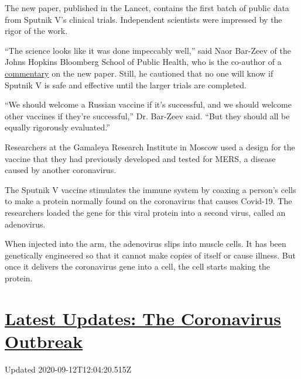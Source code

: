 The new paper, published in the Lancet, contains the first batch of
public data from Sputnik V's clinical trials. Independent scientists
were impressed by the rigor of the work.

``The science looks like it was done impeccably well,'' said Naor
Bar-Zeev of the Johns Hopkins Bloomberg School of Public Health, who is
the co-author of a
\href{https://www.thelancet.com/journals/lancet/article/PIIS0140-6736(20)31867-5/fulltext}{commentary}
on the new paper. Still, he cautioned that no one will know if Sputnik V
is safe and effective until the larger trials are completed.

``We should welcome a Russian vaccine if it's successful, and we should
welcome other vaccines if they're successful,'' Dr. Bar-Zeev said. ``But
they should all be equally rigorously evaluated.''

Researchers at the Gamaleya Research Institute in Moscow used a design
for the vaccine that they had previously developed and tested for MERS,
a disease caused by another coronavirus.

The Sputnik V vaccine stimulates the immune system by coaxing a person's
cells to make a protein normally found on the coronavirus that causes
Covid-19. The researchers loaded the gene for this viral protein into a
second virus, called an adenovirus.

When injected into the arm, the adenovirus slips into muscle cells. It
has been genetically engineered so that it cannot make copies of itself
or cause illness. But once it delivers the coronavirus gene into a cell,
the cell starts making the protein.

\hypertarget{latest-updates-the-coronavirus-outbreak}{%
\section{\texorpdfstring{\href{https://www.nytimes3xbfgragh.onion/2020/09/11/world/covid-19-coronavirus.html?action=click\&pgtype=Article\&state=default\&region=MAIN_CONTENT_1\&context=storylines_live_updates}{Latest
Updates: The Coronavirus
Outbreak}}{Latest Updates: The Coronavirus Outbreak}}\label{latest-updates-the-coronavirus-outbreak}}

Updated 2020-09-12T12:04:20.515Z

